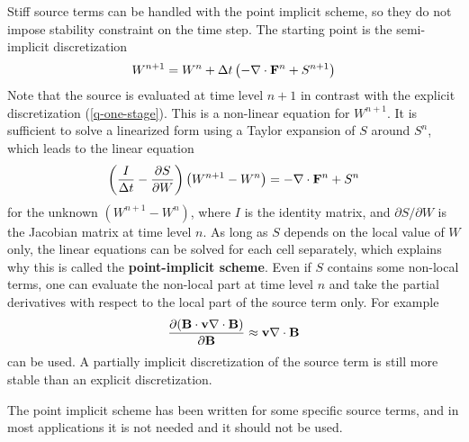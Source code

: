 Stiff source terms can be handled with the point implicit scheme,
so they do not impose stability constraint on the time step.
The starting point is the semi-implicit discretization
\begin{equation}
W^{n+1}=W^n + \Delta t\left(-\nabla\cdot\mathbf F^n + S^{n+1}\right) 
\label{q-point-implicit}
\end{equation}
Note that the source is evaluated at time level $n+1$ in contrast
with the explicit discretization (\ref{q-one-stage}). This is 
a non-linear equation for $W^{n+1}$. It is sufficient to solve a
linearized form using a Taylor expansion of $S$ around $S^n$, 
which leads to the linear equation
\begin{equation}
\left(\frac{I}{\Delta t} - \frac{\partial S}{\partial W}\right)
\left(W^{n+1}-W^n\right) = -\nabla\cdot\mathbf F^n + S^n
\label{q-point-linear}
\end{equation}
for the unknown $(W^{n+1}-W^n)$, where $I$ is the identity matrix,
and $\partial S/\partial W$ is the Jacobian matrix at time level $n$. 
As long as $S$ depends on the local value of $W$ only, the linear
equations can be solved for each cell separately, which explains
why this is called the {\bf point-implicit scheme}. 
Even if $S$ contains some non-local terms, 
one can evaluate the non-local part at time
level $n$ and take the partial derivatives with respect to the local part 
of the source term only. For example
\begin{equation}
\frac{\partial (\mathbf{B}\cdot\mathbf{v} \nabla\cdot\mathbf{B})}{\partial \mathbf{B}} \approx \mathbf{v}\nabla\cdot\mathbf{B}
\end{equation}
can be used. A partially implicit discretization of the source term
is still more stable than an explicit discretization.

The point implicit scheme has been written for some specific 
source terms, and in most applications it is not needed and it
should not be used. 


%

